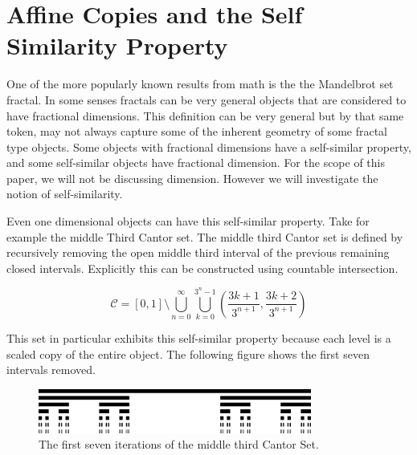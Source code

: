 \section{Affine Copies and the Self Similarity Property}

One of the more popularly known results from math is the the Mandelbrot set fractal.  In some senses fractals can be very general objects that are considered to have fractional dimensions.  This definition can be very general but by that same token, may not always capture some of the inherent geometry of some fractal type objects. Some objects with fractional dimensions have a self-similar property, and some self-similar objects have fractional dimension.  For the scope of this paper, we will not be discussing dimension. However we will investigate the notion of self-similarity. 


Even one dimensional objects can have this self-similar property. Take for example the middle Third Cantor set.  The middle third Cantor set is defined by recursively removing the open middle third interval of the previous remaining closed intervals.  Explicitly this can be constructed using countable intersection.  

\begin{example}\label{middleThirdCantor}
    $$\mathcal{C} = [0,1] \setminus \bigcup_{n=0}^\infty\bigcup_{k=0}^{3^n-1}\left(\frac{3k+1}{3^{n+1}},\frac{3k+2}{3^{n+1}}\right)$$
\end{example}

This set in particular exhibits this self-similar property because each level is a scaled copy of the entire object.  The following figure shows the first seven intervals removed.  

\begin{figure}[h]
    \includegraphics[width=0.8\textwidth]{Content/Images/Cantor_set_in_seven_iterations.jpg}
    \centering
    \caption{The first seven iterations of the middle third Cantor Set.}
\end{figure}

